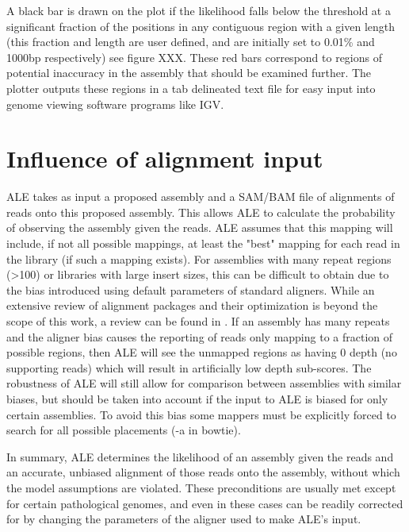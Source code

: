 \documentclass[phd,tocprelim]{cornell}
\begin{document}
A black bar is drawn on the plot if the likelihood falls below the threshold at a significant fraction of the positions in any contiguous region with a given length (this fraction and length are user defined, and are initially set to 0.01\% and 1000bp respectively) see figure XXX. These red bars correspond to regions of potential inaccuracy in the assembly that should be examined further. The plotter outputs these regions in a tab delineated text file for easy input into genome viewing software programs like IGV.


\section{Influence of alignment input} %
\label{sec:Influence of alignment input}

ALE takes as input a proposed assembly and a SAM/BAM \cite{Li2009} file of alignments of reads onto this proposed assembly. This allows ALE to calculate the probability of observing the assembly given the reads. ALE assumes that this mapping will include, if not all possible mappings, at least the "best" mapping for each read in the library (if such a mapping exists). For assemblies with many repeat regions (>100) or libraries with large insert sizes, this can be difficult to obtain due to the bias introduced using default parameters of standard aligners. While an extensive review of alignment packages and their optimization is beyond the scope of this work, a review can be found in \cite{Li2010}. If an assembly has many repeats and the aligner bias causes the reporting of reads only mapping to a fraction of possible regions, then ALE will see the unmapped regions as having 0 depth (no supporting reads) which will result in artificially low depth sub-scores. The robustness of ALE will still allow for comparison between assemblies with similar biases, but should be taken into account if the input to ALE is biased for only certain assemblies. To avoid this bias some mappers must be explicitly forced to search for all possible placements (-a in bowtie).

In summary, ALE determines the likelihood of an assembly given the reads and an accurate, unbiased alignment of those reads onto the assembly, without which the model assumptions are violated. These preconditions are usually met except for certain pathological genomes, and even in these cases can be readily corrected for by changing the parameters of the aligner used to make ALE's input.
\end{document}

